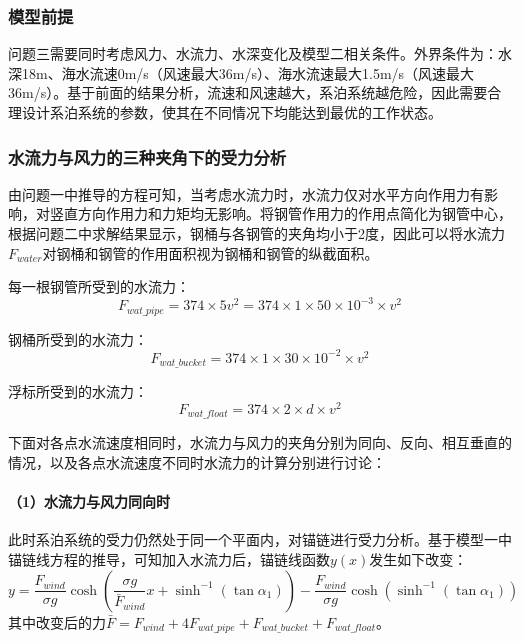 \documentclass[withoutpreface,bwprint]{cumcmthesis}
\begin{document}
\subsubsection{模型前提}
问题三需要同时考虑风力、水流力、水深变化及模型二相关条件。外界条件为：水深18m、海水流速0m/s（风速最大36m/s）、海水流速最大1.5m/s（风速最大36m/s）。基于前面的结果分析，流速和风速越大，系泊系统越危险，因此需要合理设计系泊系统的参数，使其在不同情况下均能达到最优的工作状态。

\subsubsection{水流力与风力的三种夹角下的受力分析}
由问题一中推导的方程可知，当考虑水流力时，水流力仅对水平方向作用力有影响，对竖直方向作用力和力矩均无影响。将钢管作用力的作用点简化为钢管中心，根据问题二中求解结果显示，钢桶与各钢管的夹角均小于2度，因此可以将水流力$F_{water}$对钢桶和钢管的作用面积视为钢桶和钢管的纵截面积。

每一根钢管所受到的水流力：
\begin{equation}
F_{wat\_pipe} = 374 \times 5v^2 = 374 \times 1 \times 50 \times 10^{-3} \times v^2
\end{equation}

钢桶所受到的水流力：
\begin{equation}
F_{wat\_bucket} = 374 \times 1 \times 30 \times 10^{-2} \times v^2
\end{equation}

浮标所受到的水流力：
\begin{equation}
F_{wat\_float} = 374 \times 2 \times d \times v^2
\end{equation}

下面对各点水流速度相同时，水流力与风力的夹角分别为同向、反向、相互垂直的情况，以及各点水流速度不同时水流力的计算分别进行讨论：

\paragraph{（1）水流力与风力同向时}
此时系泊系统的受力仍然处于同一个平面内，对锚链进行受力分析。基于模型一中锚链线方程的推导，可知加入水流力后，锚链线函数$y(x)$发生如下改变：
\begin{equation}
y = \frac{F_{wind}}{\sigma g}\cosh\left(\frac{\sigma g}{\bar{F}_{wind}}x + \sinh^{-1}(\tan\alpha_1)\right) - \frac{F_{wind}}{\sigma g}\cosh(\sinh^{-1}(\tan\alpha_1))
\end{equation}
其中改变后的力$\bar{F} = F_{wind} + 4F_{wat\_pipe} + F_{wat\_bucket} + F_{wat\_float}$。
\end{document}
